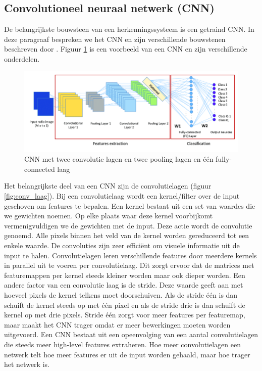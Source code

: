\subsection{Convolutioneel neuraal netwerk (CNN) }
De belangrijkste bouwsteen van een herkenningssysteem is een getraind CNN.
In deze paragraaf bespreken we het CNN en zijn verschillende bouwstenen beschreven door \cite{jiang_deep_2019}.
Figuur \ref{fig:cnn} is een voorbeeld van een CNN en zijn verschillende onderdelen.

\begin{figure}[!ht]
    \centering
 	\includegraphics[width=0.85\linewidth]{fig/cnn_2.png}
 	\caption{CNN met twee convolutie lagen en twee pooling lagen en \'e\'en fully-connected laag}
 	\label{fig:cnn}
\end{figure}
 
Het belangrijkste deel van een CNN zijn de convolutielagen (figuur \ref{fig:conv_laag}). 
Bij een convolutielaag wordt een kernel/filter over de input geschoven om features te bepalen. 
Een kernel bestaat uit een set van waardes die we gewichten noemen.
Op elke plaats waar deze kernel voorbijkomt vermenigvuldigen we de gewichten met de input.
Deze actie wordt de convolutie genoemd.
Alle pixels binnen het veld van de kernel worden gereduceerd tot een enkele waarde. 
De convoluties zijn zeer effici\"ent om visuele informatie uit de input te halen.
Convolutielagen leren verschillende features door meerdere kernels in parallel uit te voeren per convolutielaag. 
Dit zorgt ervoor dat de matrices met featuremappen per kernel steeds kleiner worden maar ook dieper worden. 
Een andere factor van een convolutie laag is de stride.
Deze waarde geeft aan met hoeveel pixels de kernel telkens moet doorschuiven. 
Als de stride \'e\'en is dan schuift de kernel steeds op met \'e\'en pixel en als de stride drie is dan schuift de kernel op met drie pixels.
Stride \'e\'en zorgt voor meer features per featuremap, maar maakt het CNN trager omdat er meer bewerkingen moeten worden uitgevoerd.
Een CNN bestaat uit een opeenvolging van een aantal convolutielagen die steeds meer high-level features extraheren. 
Hoe meer convolutielagen een netwerk telt hoe meer features er uit de input worden gehaald, maar hoe trager het netwerk is. 

